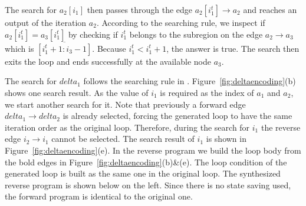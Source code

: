 The search for $a_2[i_1]$ then passes through the edge $a_2[i_1^t]\to a_2$ and reaches an output of the iteration $a_2$. 
According to the searching rule, we inspect if $a_2[i_1^t]=a_3[i_1^t]$ by checking if $i_1^t$ belongs to the subregion on the edge $a_2\to a_3$ which is $\overline{[i_1^t+1:i_3-1]}$. 
Because $i_1^t<i_1^t+1$, the answer is true.
The search then exits the loop  and ends successfully at the available node $a_3$.

The search for $delta_1$ follows the searching rule in \cite{HouRC}.
%
Figure~\ref{fig:deltaencoding}(b) shows one search result. 
As the value of $i_1$ is required as the index of $a_1$ and $a_2$, we start another search for it.
Note that previously a forward edge $delta_1 \to delta_2$ is already selected, forcing the generated loop to have the same iteration order as the original loop. 
Therefore, during the search for $i_1$ the reverse edge $i_2\to i_1$ cannot be selected.
The search result of $i_1$ is shown in Figure~\ref{fig:deltaencoding}(e).
In the reverse program we build the loop body from the bold edges in  Figure~\ref{fig:deltaencoding}(b)\&(e).
The loop condition of the generated loop is built as the same  one  in the original loop.
The synthesized reverse program is shown below on the left.
Since there is no state saving used, the forward program is identical to the original one.

